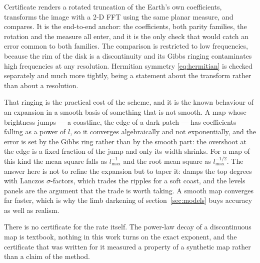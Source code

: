 Certificate  renders a rotated truncation of the Earth's own coefficients,
transforms the image with a 2-D FFT using the same planar measure, and compares.  It is the end-to-end anchor: the
coefficients, both parity families, the rotation and the measure all enter, and it
is the only check that would catch an error common to both families.  The comparison
is restricted to low frequencies, because the rim of the disk is a discontinuity and
its Gibbs ringing contaminates high frequencies at any resolution.  Hermitian
symmetry \eqref{eq:hermitian} is checked separately and much more tightly, being a
statement about the transform rather than about a resolution.

That ringing is the practical cost of the scheme, and it is the known behaviour of an
expansion in a smooth basis of something that is not smooth.  A map whose brightness jumps --- a
coastline, the edge of a dark patch --- has coefficients falling as a power of $l$, so it
converges algebraically and not exponentially, and the error is set by the Gibbs ring rather
than by the smooth part: the overshoot at the edge is a fixed fraction of the jump and only
its width shrinks.  For a map of this kind the mean square falls as $l_{\max}^{-1}$ and the
root mean square as $l_{\max}^{-1/2}$.  The answer here is not to refine the expansion but to
taper it:  damps the top degrees with Lanczos $\sigma$-factors, which trades
the ripples for a soft coast, and the levels panels are the argument that the trade is worth
taking.  A smooth map converges far faster, which is why the limb darkening of
section~\ref{sec:models} buys accuracy as well as realism.

There is no certificate for the rate itself.  The power-law decay of a discontinuous map is
textbook, nothing in this work turns on the exact exponent, and the certificate that was written
for it measured a property of a synthetic map rather than a claim of the method.

